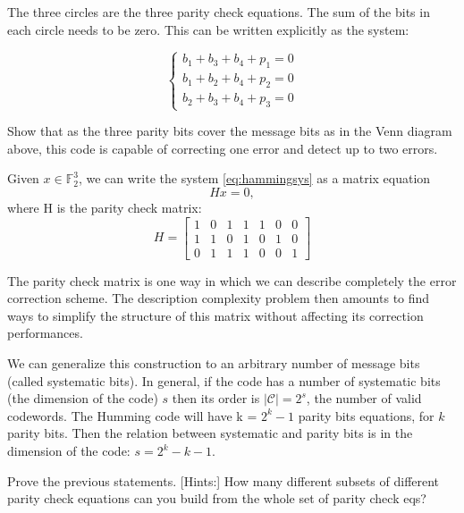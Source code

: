 The three circles are the three parity check equations. The sum of the bits in each circle needs to be zero. This can be written explicitly as the system:

\begin{equation}
	\begin{cases}
		b_1 + b_3 + b_4 +p_1 = 0 \\
		b_1 + b_2 + b_4 +p_2 = 0 \\
		b_2 + b_3 + b_4 +p_3 = 0
	\end{cases}
	\label{eq:hammingsys}
\end{equation}

\begin{example}[Exercise]
Show that as the three parity bits cover the message bits as in the Venn diagram above, this code is capable of correcting one error and detect up to two errors.
\end{example}

Given $x \in \mathbb{F}^3_2 $, we can write the system \ref{eq:hammingsys} as a matrix equation
\begin{equation}
Hx = 0,
\end{equation}
where H is the parity check matrix:
\begin{equation}
H = \left[\begin{matrix}
1 & 0 & 1 & 1 & 1 & 0 & 0 \\
1 & 1 & 0 & 1 & 0 & 1 & 0 \\
0 & 1 & 1 & 1 & 0 & 0 & 1
\end{matrix} \right]
\end{equation}

The parity check matrix is one way in which we can describe completely the error correction scheme. The description complexity problem then amounts to find ways to simplify the structure of this matrix without affecting its correction performances.


We can generalize this construction to an arbitrary number of message bits (called systematic bits). In general, if the code has a number of systematic bits (the dimension of the code) $s$ then its order is $|\mathcal{C}| = 2^{s}$, the number of valid codewords. The Humming code will have k = $ 2^k -1 $ parity bits equations, for $k$ parity bits. Then the relation between systematic and parity bits is in the dimension of the code: $s = 2^{k} - k - 1$.

\begin{example}
	Prove the previous statements.
	[Hints:] How many different subsets of different parity check equations can you build from the whole set of parity check eqs?
\end{example}

